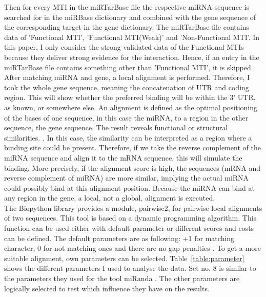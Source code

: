 \documentclass[11pt, a4paper, twoside]{book}
\begin{document}
Then for every MTI in the miRTarBase file the respective miRNA sequence is searched for in the miRBase dictionary and combined with the gene sequence of the corresponding target in the gene dictionary. The miRTarBase file contains data of 'Functional MTI', 'Functional MTI(Weak)' and 'Non-Functional MTI'. In this paper, I only consider the strong validated data of the Functional MTIs because they deliver strong evidence for the interaction. Hence, if an entry in the miRTarBase file contains something other than 'Functional MTI', it is skipped. \\

After matching miRNA and gene, a local alignment is performed. Therefore, I took the whole gene sequence, meaning the concatenation of UTR and coding region. This will show whether the preferred binding will be within the 3' UTR, as known, or somewhere else. An alignment is defined as the optimal positioning of the bases of one sequence, in this case the miRNA, to a region in the other sequence, the gene sequence. The result reveals functional or structural similarities. \cite{alignment}. In this case, the similarity can be interpreted as a region where a binding site could be present. Therefore, if we take the reverse complement of the miRNA sequence and align it to the mRNA sequence, this will simulate the binding. More precisely, if the alignment score is high, the sequences (mRNA and reverse complement of miRNA) are more similar, implying the actual miRNA could possibly bind at this alignment position. Because the miRNA can bind at any region in the gene, a local, not a global, alignment is executed.\\

The Biopython library provides a module, pairwise2, for pairwise local alignments of two sequences. This tool is based on a dynamic programming algorithm. This function can be used either with default parameter or different scores and costs can be defined. The default parameters are as following: +1 for matching character, 0 for not matching ones and there are no gap penalties \cite{pairwise}. To get a more suitable alignment, own parameters can be selected. Table~\ref{table:parameter} shows the different parameters I used to analyse the data. Set no. 8 is similar to the parameters they used for the tool miRanda \cite{Enright}. The other parameters are logically selected to test which influence they have on the results. \\\\
\end{document}
